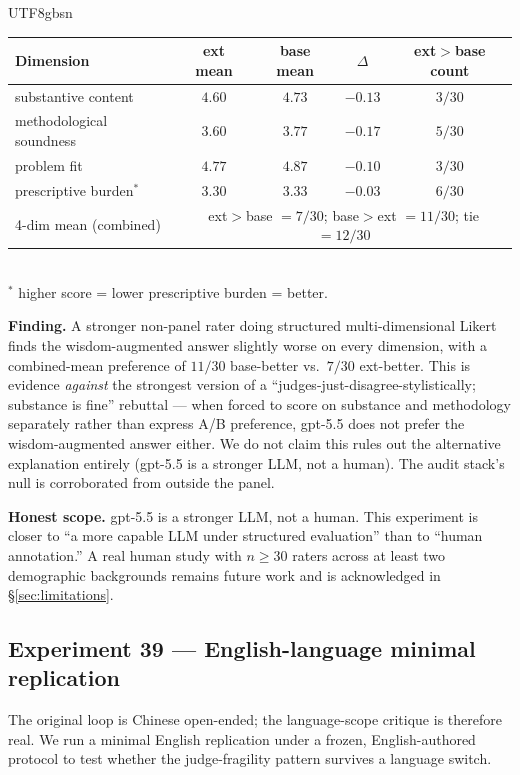 \documentclass{article}
\begin{document}
\begin{CJK*}{UTF8}{gbsn}
\begin{center}\small
\begin{tabular}{l c c c c}
  \toprule
  Dimension & ext mean & base mean & \(\Delta\) & ext\(>\)base count \\
  \midrule
  substantive content    & \(4.60\) & \(4.73\) & \(-0.13\) & \(3/30\) \\
  methodological soundness & \(3.60\) & \(3.77\) & \(-0.17\) & \(5/30\) \\
  problem fit            & \(4.77\) & \(4.87\) & \(-0.10\) & \(3/30\) \\
  prescriptive burden\(^*\)  & \(3.30\) & \(3.33\) & \(-0.03\) & \(6/30\) \\
  \midrule
  4-dim mean (combined)  & \multicolumn{4}{c}{ext\(>\)base \(=7/30\); base\(>\)ext \(=11/30\); tie \(=12/30\)} \\
  \bottomrule
\end{tabular}\\
\small\(^*\) higher score = lower prescriptive burden = better.
\end{center}

\textbf{Finding.} A stronger non-panel rater doing structured
multi-dimensional Likert finds the wisdom-augmented answer
slightly worse on every dimension, with a combined-mean
preference of \(11/30\) base-better vs.\ \(7/30\) ext-better.
This is evidence \emph{against} the strongest version of a
``judges-just-disagree-stylistically; substance is fine''
rebuttal --- when forced to score on substance and methodology
separately rather than express A/B preference, gpt-5.5 does not
prefer the wisdom-augmented answer either. We do not claim this
rules out the alternative explanation entirely (gpt-5.5 is a
stronger LLM, not a human). The audit stack's null is
corroborated from outside
the panel.

\textbf{Honest scope.} gpt-5.5 is a stronger LLM, not a human.
This experiment is closer to ``a more capable LLM under structured
evaluation'' than to ``human annotation.'' A real human study with
\(n \geq 30\) raters across at least two demographic backgrounds
remains future work and is acknowledged in
\S\ref{sec:limitations}.

\subsection{Experiment 39 — English-language minimal replication}
\label{sec:exp39}

The original loop is Chinese open-ended; the language-scope
critique is therefore real. We run a minimal English replication
under a frozen, English-authored protocol to test whether the
judge-fragility pattern survives a language switch.


\end{CJK*}
\end{document}
